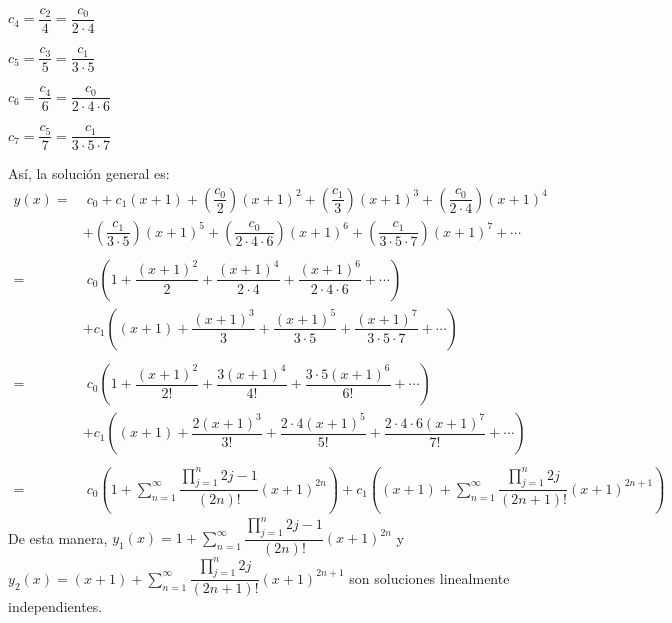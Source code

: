 \documentclass[fleqn]{article}
\begin{document}
    $ c_4 = \dfrac{c_2}{4} = \dfrac{c_0}{2 \cdot 4} $

    $ c_5 = \dfrac{c_3}{5} = \dfrac{c_1}{3 \cdot 5} $

    $ c_6 = \dfrac{c_4}{6} = \dfrac{c_0}{2 \cdot 4 \cdot 6} $

    $ c_7 = \dfrac{c_5}{7} = \dfrac{c_1}{3 \cdot 5 \cdot 7} $

    Así, la solución general es:
    \begin{align*}
        y(x) =& \; c_0 + c_1 (x+1) + \left( \dfrac{c_0}{2} \right)(x+1)^2 + \left( \dfrac{c_1}{3} \right)(x+1)^3 + \left( \dfrac{c_0}{2 \cdot 4} \right)(x+1)^4 \\
        & + \left( \dfrac{c_1}{3 \cdot 5} \right)(x+1)^5 + \left( \dfrac{c_0}{2 \cdot 4 \cdot 6} \right)(x+1)^6 + \left( \dfrac{c_1}{3 \cdot 5 \cdot 7} \right)(x+1)^7 + \cdots \\\\
        =& \; c_0 \left( 1 + \dfrac{(x+1)^2}{2} + \dfrac{(x+1)^4}{2 \cdot 4} + \dfrac{(x+1)^6}{2 \cdot 4 \cdot 6} + \cdots \right) \\ 
        & + c_1 \left( (x+1) + \dfrac{(x+1)^3}{3} + \dfrac{(x+1)^5}{3 \cdot 5} + \dfrac{(x+1)^7}{3 \cdot 5 \cdot 7} + \cdots \right) \\\\
        =& \; c_0 \left( 1 + \dfrac{(x+1)^2}{2!} + \dfrac{3(x+1)^4}{4!} + \dfrac{3 \cdot 5(x+1)^6}{6!} + \cdots \right) \\
        & + c_1 \left( (x+1) + \dfrac{2(x+1)^3}{3!} + \dfrac{2 \cdot 4(x+1)^5}{5!} + \dfrac{2 \cdot 4 \cdot 6(x+1)^7}{7!} + \cdots \right) \\\\
        =& \; c_0 \left(1 + \sum_{n=1}^{\infty} \dfrac{\displaystyle \prod_{j=1}^{n} 2j-1}{(2n)!} (x+1)^{2n} \right) + c_1 \left( (x+1) + \sum_{n=1}^{\infty} \dfrac{\displaystyle \prod_{j=1}^{n} 2j}{(2n+1)!} (x+1)^{2n+1} \right)
    \end{align*}
    De esta manera, $ y_1(x) = 1 + \displaystyle \sum_{n=1}^{\infty} \dfrac{\displaystyle \prod_{j=1}^{n} 2j-1}{(2n)!} (x+1)^{2n} $ y $ y_2(x) = (x+1) + \displaystyle \sum_{n=1}^{\infty} \dfrac{\displaystyle \prod_{j=1}^{n} 2j}{(2n+1)!} (x+1)^{2n+1} $ son soluciones linealmente independientes.
\end{document}
